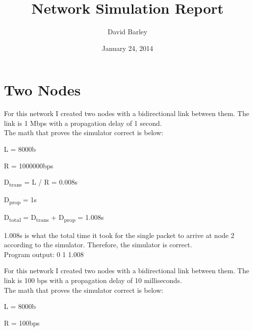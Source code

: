 \documentclass[11pt]{article}
\begin{document}
\lstset{
	language=Python,
	basicstyle=\small,          %
	keywordstyle=\bfseries,
	identifierstyle=,           %
	commentstyle=,              %
	stringstyle=\ttfamily,      %
	showstringspaces=false,     %
	numbers=left,
	numberstyle=\tiny,
	numbersep=5pt,
	frame=tb,
}

\title{Network Simulation Report}

\author{David Barley}

\date{January 24, 2014}

\maketitle

\section{Two Nodes}

For this network I created two nodes with a bidirectional link between them. The link is 1 Mbps with a propagation delay of 1 second.\\
The math that proves the simulator correct is below:

L = 8000b

R = 1000000bps

D\textsubscript{trans} = L / R = 0.008s

D\textsubscript{prop} = 1s

D\textsubscript{total} = D\textsubscript{trans} + D\textsubscript{prop} = 1.008s

\noindent
1.008s is what the total time it took for the single packet to arrive at node 2 according to the simulator. Therefore, the simulator is correct.\\Program output: 0 1 1.008



\vspace{1.0cm}

For this network I created two nodes with a bidirectional link between them. The link is 100 bps with a propagation delay of 10 milliseconds.\\
The math that proves the simulator correct is below:

L = 8000b

R = 100bps
\end{document}
